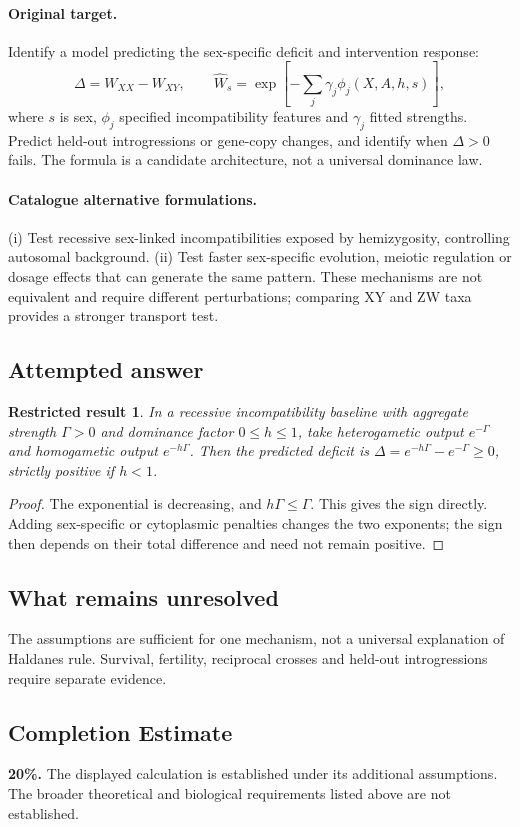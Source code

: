\documentclass[11pt]{article}
\newtheorem{attemptresult}{Restricted result}[section]
\begin{document}
\paragraph{Original target.}
Identify a model predicting the sex-specific deficit and intervention response:
\[
\Delta=W_{XX}-W_{XY},\qquad
\widehat W_s=\exp\!\left[-\sum_{j}\gamma_j\phi_j(X,A,h,s)\right],
\]
where $s$ is sex, $\phi_j$ specified incompatibility features and $\gamma_j$ fitted strengths. Predict held-out introgressions or gene-copy changes, and identify when $\Delta>0$ fails. The formula is a candidate architecture, not a universal dominance law.
\paragraph{Catalogue alternative formulations.}
(i) Test recessive sex-linked incompatibilities exposed by hemizygosity, controlling autosomal background. (ii) Test faster sex-specific evolution, meiotic regulation or dosage effects that can generate the same pattern. These mechanisms are not equivalent and require different perturbations; comparing XY and ZW taxa provides a stronger transport test.
\subsection{Attempted answer}
\begin{attemptresult}
In a recessive incompatibility baseline with aggregate strength $\Gamma>0$ and dominance factor $0\leq h\leq1$, take heterogametic output $e^{-\Gamma}$ and homogametic output $e^{-h\Gamma}$. Then the predicted deficit is $\Delta=e^{-h\Gamma}-e^{-\Gamma}\geq0$, strictly positive if $h<1$.
\end{attemptresult}
\begin{proof}
The exponential is decreasing, and $h\Gamma\leq\Gamma$. This gives the sign directly. Adding sex-specific or cytoplasmic penalties changes the two exponents; the sign then depends on their total difference and need not remain positive.
\end{proof}
\subsection{What remains unresolved}
The assumptions are sufficient for one mechanism, not a universal explanation of Haldane\textquotesingle s rule. Survival, fertility, reciprocal crosses and held-out introgressions require separate evidence.
\subsection{Completion Estimate}
\textbf{20\%.} The displayed calculation is established under its additional assumptions. The broader theoretical and biological requirements listed above are not established.
\end{document}
